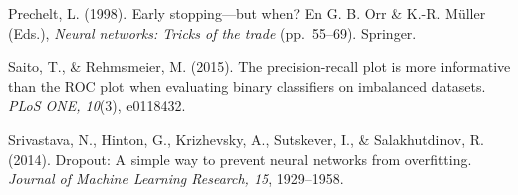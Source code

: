 \documentclass[11pt,a4paper]{article}
\begin{document}
Prechelt, L. (1998). Early stopping---but when? En G. B. Orr \& K.-R. Müller (Eds.), \textit{Neural networks: Tricks of the trade} (pp.~55--69). Springer.

Saito, T., \& Rehmsmeier, M. (2015). The precision-recall plot is more informative than the ROC plot when evaluating binary classifiers on imbalanced datasets. \textit{PLoS ONE, 10}(3), e0118432.

Srivastava, N., Hinton, G., Krizhevsky, A., Sutskever, I., \& Salakhutdinov, R. (2014). Dropout: A simple way to prevent neural networks from overfitting. \textit{Journal of Machine Learning Research, 15}, 1929--1958.
\par\endgroup
\end{document}
